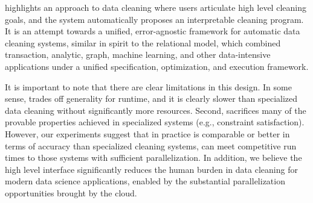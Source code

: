 

\sys highlights an approach to data cleaning where users articulate high level cleaning goals, and the system automatically proposes an interpretable cleaning program.  It is an attempt towards a unified, error-agnostic framework for automatic data cleaning systems, similar in spirit to the relational model, which combined transaction, analytic, graph, machine learning, and other data-intensive applications under a unified specification, optimization, and execution framework.


It is important to note that there are clear limitations in this design.
In some sense, \sys trades off generality for runtime, and it is clearly slower than specialized data cleaning without significantly more resources.
Second, \sys sacrifices many of the provable properties achieved in specialized systems (e.g., constraint satisfaction). 
However, our experiments suggest that in practice \sys is comparable or better in terms of accuracy than specialized cleaning systems, can meet competitive run times to those systems with sufficient parallelization. In addition, we believe the high level interface significantly reduces the human burden in data cleaning for modern data science applications, enabled by the substantial parallelization opportunities brought by the cloud. 





